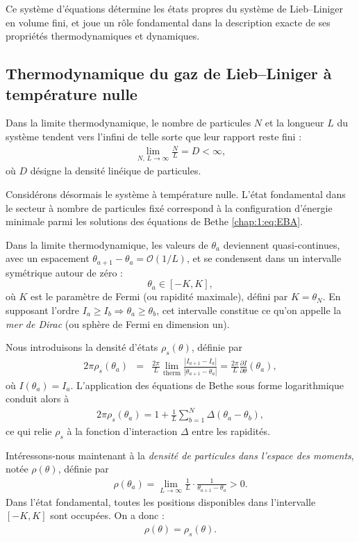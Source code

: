 Ce système d'équations détermine les états propres du système de Lieb–Liniger en volume fini, et joue un rôle fondamental dans la description exacte de ses propriétés thermodynamiques et dynamiques.


\subsection{Thermodynamique du gaz de Lieb–Liniger à température nulle}

Dans la limite thermodynamique, le nombre de particules \( N \) et la longueur \( L \) du système tendent vers l'infini de telle sorte que leur rapport reste fini :
\begin{eqnarray*}
	\lim_{N,\, L \to \infty} \frac{N}{L} = D < \infty,
\end{eqnarray*}
où \( D \) désigne la densité linéique de particules.

Considérons désormais le système à température nulle. L’état fondamental dans le secteur à nombre de particules fixé correspond à la configuration d’énergie minimale parmi les solutions des équations de Bethe \eqref{chap:1:eq:EBA}.

Dans la limite thermodynamique, les valeurs de \( \theta_a \) deviennent quasi-continues, avec un espacement \( \theta_{a+1} - \theta_a = \mathcal{O}(1/L) \), et se condensent dans un intervalle symétrique autour de zéro :
\[
\theta_a \in [-K, K],
\]
où \( K \) est le paramètre de Fermi (ou rapidité maximale), défini par \( K = \theta_N \). En supposant l'ordre \( I_a \geq I_b \Rightarrow \theta_a \geq \theta_b \), cet intervalle constitue ce qu'on appelle la {\em mer de Dirac} (ou sphère de Fermi en dimension un).

Nous introduisons la densité d’états \( \rho_s(\theta) \), définie par
\begin{eqnarray*}
	2\pi \rho_s(\theta_a) &=& \frac{2\pi}{L} \lim_{\text{therm}} \frac{|I_{a+1} - I_a|}{|\theta_{a+1} - \theta_a|} = \frac{2\pi}{L} \frac{\partial I}{\partial \theta}(\theta_a),
\end{eqnarray*}
où \( I(\theta_a) = I_a \). L’application des équations de Bethe sous forme logarithmique conduit alors à
\begin{eqnarray*}
	2\pi \rho_s(\theta_a) = 1 + \frac{1}{L} \sum_{b = 1}^N \Delta(\theta_a - \theta_b),
\end{eqnarray*}
ce qui relie \( \rho_s \) à la fonction d’interaction \( \Delta \) entre les rapidités.

Intéressons-nous maintenant à la {\em densité de particules dans l’espace des moments}, notée \( \rho(\theta) \), définie par
\begin{eqnarray*}
	\rho(\theta_a) = \lim_{L \to \infty} \frac{1}{L} \cdot \frac{1}{\theta_{a+1} - \theta_a} > 0.
\end{eqnarray*}
Dans l’état fondamental, toutes les positions disponibles dans l’intervalle \( [-K, K] \) sont occupées. On a donc :
\begin{eqnarray}\label{chap.1.rho.2}
	\rho(\theta) = \rho_s(\theta).
\end{eqnarray}

